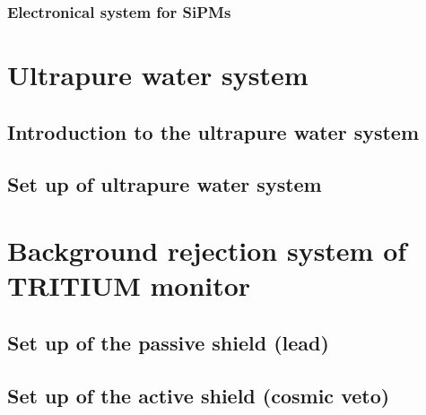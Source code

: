 \documentclass[12pt,a4paper]{book}
\begin{document}
			\subsubsection[Electronical system for a SiPM]{Electronical system for SiPMs}
			\label{subsubsec:SiPMsElectronicalSystem}
			\newpage		
		
	\section{Ultrapure water system}\label{sec:UltraPureWaterSystem}
		
		\subsection[Introduction water system]{Introduction to the ultrapure water system}
		 \label{subsec:IntroductionWaterSystem}
					
		\subsection[Set up water system]{Set up of ultrapure water system} %
		\label{subsec:SetUpWaterSystem}
		\newpage	
	
	\section[Background rejection system]{Background rejection system of TRITIUM monitor}\label{sec:BackgroundShields}
	 \label{sec:IntroductionBackground}
	
		\subsection[Set up passive shield]{Set up of the passive shield (lead)} %
		\label{subsec:SetUpPassiveShield}
		
		\subsection[Set up Active veto]{Set up of the active shield (cosmic veto)} %
		\label{subsec:SetUpActiveShield}
		\newpage
					
\end{document}
